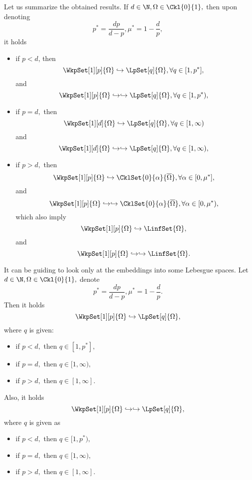 \begin{remark}[Summary]
    Let us summarize the obtained results. If $d \in \N, \Omega \in \Ckl{0}{1},$ then upon denoting
    \[
	    p^{*} = \frac{dp}{d-p}, \mu^{*} = 1- \frac{d}{p},
    \]
    it holds

    \begin{itemize}
	    \item if $p < d$, then
		    \[
			    \WkpSet[1][p]{\Omega} \hookrightarrow \LpSet[q]{\Omega}, \forall q \in [1,p^{*}],
		    \]
		    and
		    \[
			    \WkpSet[1][p]{\Omega} \hookrightarrow \hookrightarrow \LpSet[q]{\Omega}, \forall q \in [1,p^{*}),
		    \]
	    \item if $p = d,$ then
		    \[
			    \WkpSet[1][d]{\Omega} \hookrightarrow \LpSet[q]{\Omega}, \forall q \in [1, \infty)
		    \]
		    and
		    \[
			    \WkpSet[1][d]{\Omega} \hookrightarrow \hookrightarrow \LpSet[q]{\Omega}, \forall q \in [1, \infty),
		    \]
	    \item if $p > d,$ then
		    \[
			    \WkpSet[1][p]{\Omega} \hookrightarrow \CklSet{0}{\alpha}{\overline{\Omega}}, \forall \alpha \in [0, \mu^{*}],
		    \]
		    and
		    \[
			    \WkpSet[1][p]{\Omega} \hookrightarrow \hookrightarrow \CklSet{0}{\alpha}{\overline{\Omega}}, \forall \alpha \in [0, \mu^{*}),
		    \]
		    which also imply
		    \[
			    \WkpSet[1][p]{\Omega} \hookrightarrow \LinfSet{\Omega},
		    \]
		    and
		    \[
			    \WkpSet[1][p]{\Omega} \hookrightarrow \hookrightarrow \LinfSet{\Omega}.
		    \]
		    
    \end{itemize}
\end{remark}

\begin{remark}
    It can be guiding to look only at the embeddings into some Lebesgue spaces. Let $d \in \N, \Omega \in \Ckl{0}{1},$ denote
    \[
	    p^{*} = \frac{dp}{d-p}, \mu^{*} = 1 - \frac{d}{p}.
    \]
    Then it holds
    \[
	    \WkpSet[1][p]{\Omega} \hookrightarrow \LpSet[q]{\Omega},
    \]
    where $q$ is given: 
    \begin{itemize}
	    \item if $p<d,$ then $q \in [1, p^{*}],$
	    \item if $p=d,$ then $q \in [1, \infty),$
	    \item if $p>d,$ then $q \in [1,\infty].$
    \end{itemize}

    Also, it holds
    \[
	    \WkpSet[1][p]{\Omega} \hookrightarrow \hookrightarrow \LpSet[q]{\Omega},
    \]
    where $q$ is given as 
    \begin{itemize}
	    \item if $p<d,$ then $q \in [1, p^{*}),$
	    \item if $p=d,$ then $q \in [1,\infty),$
	    \item if $p>d,$ then $q \in [1, \infty].$
    \end{itemize}
\end{remark}

